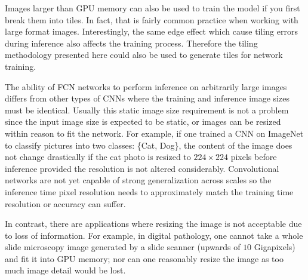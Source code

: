 \documentclass[10pt, indentfirst]{article}
\begin{document}
Images larger than GPU memory can also be used to train the model if you first break them into tiles. In fact, that is fairly common practice when working with large format images. Interestingly, the same edge effect which cause tiling errors during inference also affects the training process. Therefore the tiling methodology presented here could also be used to generate tiles for network training.


The ability of FCN networks to perform inference on arbitrarily large images differs from other types of CNNs where the training and inference image sizes must be identical. Usually this static image size requirement is not a problem since the input image size is expected to be static, or images can be resized within reason to fit the network. For example, if one trained a CNN on ImageNet \citep{Russakovsky2015} to classify pictures into two classes: \{Cat, Dog\}, the content of the image does not change drastically if the cat photo is resized to $224 \times 224$ pixels before inference provided the resolution is not altered considerably. Convolutional networks are not yet capable of strong generalization across scales \citep{Jaderberg2015,Lin2017a} so the inference time pixel resolution needs to approximately match the training time resolution or accuracy can suffer.

In contrast, there are applications where resizing the image is not acceptable due to loss of information. For example, in digital pathology, one cannot take a whole slide microscopy image generated by a slide scanner (upwards of $\num{10}$ Gigapixels) and fit it into GPU memory; nor can one reasonably resize the image as too much image detail would be lost. 
\end{document}
